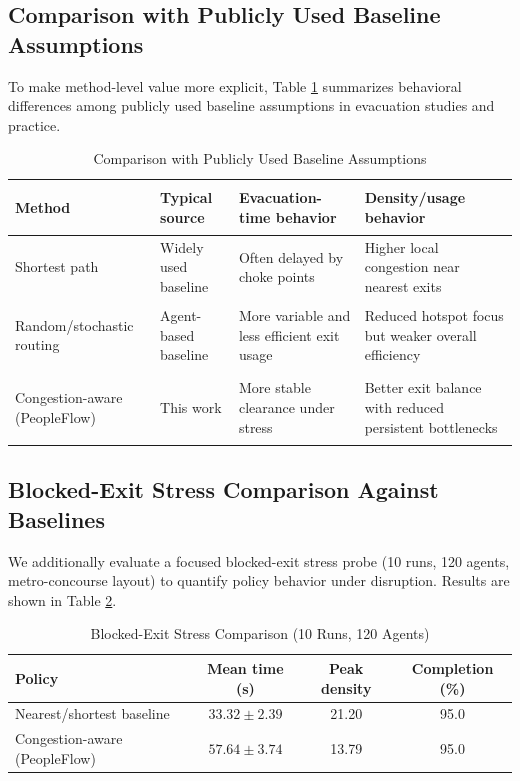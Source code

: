 \documentclass[journal]{IEEEtran}
\begin{document}
\subsection{Comparison with Publicly Used Baseline Assumptions}
To make method-level value more explicit, Table \ref{tab:routing_assumptions} summarizes behavioral differences among publicly used baseline assumptions in evacuation studies and practice.

\begin{table}[!htbp]
\centering
\caption{Comparison with Publicly Used Baseline Assumptions}
\label{tab:routing_assumptions}
{\footnotesize
\setlength{\tabcolsep}{3pt}
\begin{tabular}{>{\bfseries\raggedright\arraybackslash}p{1.95cm} >{\raggedright\arraybackslash}p{1.30cm} >{\raggedright\arraybackslash}p{1.70cm} >{\raggedright\arraybackslash}p{1.35cm}}
\toprule
Method & Typical source & Evacuation-time behavior & Density/\allowbreak usage behavior \\
\midrule
Shortest path & Widely used baseline \cite{path_planning} & Often delayed by choke points & Higher local congestion near nearest exits \\
Random/\allowbreak stochastic routing & Agent-based baseline \cite{pan2007} & More variable and less efficient exit usage & Reduced hotspot focus but weaker overall efficiency \\
Congestion-aware (PeopleFlow) & This work & More stable clearance under stress & Better exit balance with reduced persistent bottlenecks \\
\bottomrule
\end{tabular}
}
\end{table}

\subsection{Blocked-Exit Stress Comparison Against Baselines}
We additionally evaluate a focused blocked-exit stress probe (10 runs, 120 agents, metro-concourse layout) to quantify policy behavior under disruption. Results are shown in Table \ref{tab:blocked_policy_comparison}.

\begin{table}[!htbp]
\centering
\caption{Blocked-Exit Stress Comparison (10 Runs, 120 Agents)}
\label{tab:blocked_policy_comparison}
{\footnotesize
\setlength{\tabcolsep}{3pt}
\begin{tabular}{>{\raggedright\arraybackslash}p{2.2cm}ccc}
\toprule
\textbf{Policy} & \textbf{Mean time (s)} & \textbf{Peak density} & \textbf{Completion (\%)} \\
\midrule
Nearest/shortest baseline & $33.32 \pm 2.39$ & 21.20 & 95.0 \\
Congestion-aware (PeopleFlow) & $57.64 \pm 3.74$ & 13.79 & 95.0 \\
\bottomrule
\end{tabular}
}
\end{table}
\end{document}
